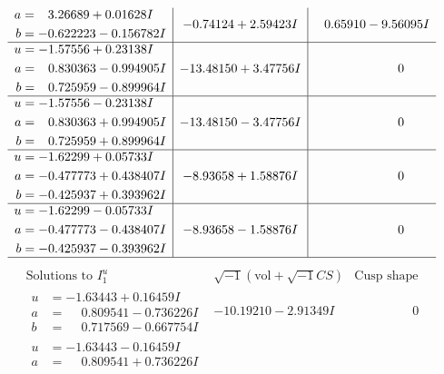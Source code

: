 \documentclass[1p]{elsarticle_modified}
\theoremstyle{definition}
\newcommand{\I}{\sqrt{-1}}
\begin{document}
$$\begin{array}{c|c|c}
\begin{aligned}
a &= \phantom{-}3.26689 + 0.01628 I \\
b &= -0.622223 - 0.156782 I\end{aligned}
 & -0.74124 + 2.59423 I & \phantom{-}0.65910 - 9.56095 I \\ \hline\begin{aligned}
u &= -1.57556 + 0.23138 I \\
a &= \phantom{-}0.830363 - 0.994905 I \\
b &= \phantom{-}0.725959 - 0.899964 I\end{aligned}
 & -13.48150 + 3.47756 I & \phantom{-0.000000 } 0 \\ \hline\begin{aligned}
u &= -1.57556 - 0.23138 I \\
a &= \phantom{-}0.830363 + 0.994905 I \\
b &= \phantom{-}0.725959 + 0.899964 I\end{aligned}
 & -13.48150 - 3.47756 I & \phantom{-0.000000 } 0 \\ \hline\begin{aligned}
u &= -1.62299 + 0.05733 I \\
a &= -0.477773 + 0.438407 I \\
b &= -0.425937 + 0.393962 I\end{aligned}
 & -8.93658 + 1.58876 I & \phantom{-0.000000 } 0 \\ \hline\begin{aligned}
u &= -1.62299 - 0.05733 I \\
a &= -0.477773 - 0.438407 I \\
b &= -0.425937 - 0.393962 I\end{aligned}
 & -8.93658 - 1.58876 I & \phantom{-0.000000 } 0\\
 \hline 
 \end{array}$$\newpage$$\begin{array}{c|c|c}  
\text{Solutions to }I^u_{1}& \I (\text{vol} + \sqrt{-1}CS) & \text{Cusp shape}\\
 \hline 
\begin{aligned}
u &= -1.63443 + 0.16459 I \\
a &= \phantom{-}0.809541 - 0.736226 I \\
b &= \phantom{-}0.717569 - 0.667754 I\end{aligned}
 & -10.19210 - 2.91349 I & \phantom{-0.000000 } 0 \\ \hline\begin{aligned}
u &= -1.63443 - 0.16459 I \\
a &= \phantom{-}0.809541 + 0.736226 I \\

\end{aligned}
\end{array}$$
\end{document}
